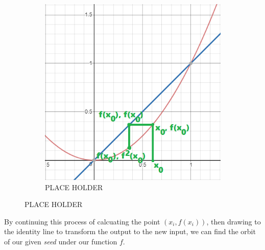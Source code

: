 \documentclass[20pt]{article} %
\begin{document}
\begin{figure}[!htbp]
  	\centering
   	\begin{subfigure}[p]{0.5\linewidth}
    	\includegraphics[width=\linewidth]{./figures/fp-3.png}
	\caption{PLACE HOLDER}
   	\end{subfigure}
\end{figure} 

By continuing this process of calcuating the point $(x_i, f(x_i))$, then drawing to the identity line to transform the output to the new input, we can find the orbit of our given \textit{seed} under our function $f$.
\end{document}
